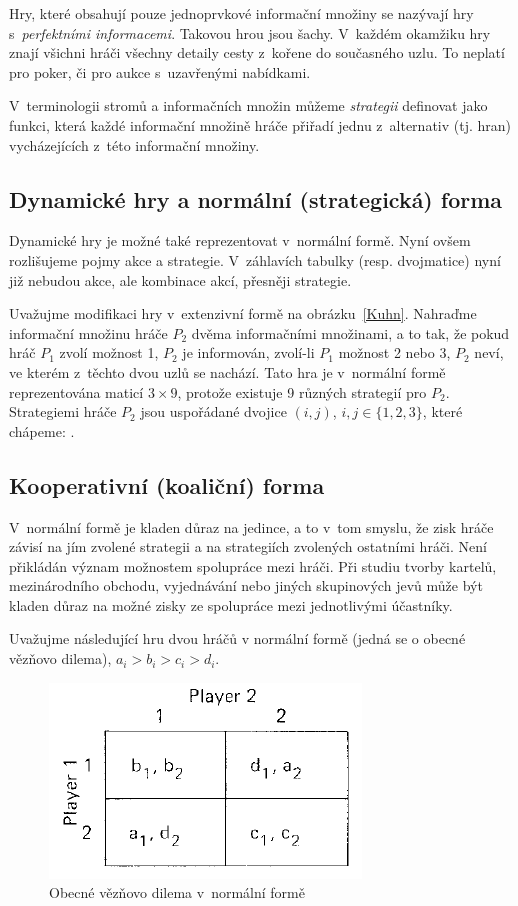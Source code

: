 \documentclass[12pt,a5paper]{article}
\begin{document}
Hry, které obsahují pouze jednoprvkové informační množiny se nazývají hry s~\emph{perfektními informacemi}. Takovou hrou jsou šachy. V~každém okamžiku hry znají všichni hráči všechny detaily cesty z~kořene do současného uzlu. To neplatí pro poker, či pro aukce s~uzavřenými nabídkami.

V~terminologii stromů a informačních množin můžeme \emph{strategii} definovat jako funkci, která každé informační množině hráče přiřadí jednu z~alternativ (tj. hran) vycházejících z~této informační množiny. 

\subsection{Dynamické hry a normální (strategická) forma}
Dynamické hry je možné také reprezentovat v~normální formě. Nyní ovšem rozlišujeme pojmy akce a strategie. V~záhlavích tabulky (resp. dvojmatice) nyní již nebudou akce, ale kombinace akcí, přesněji strategie.

Uvažujme modifikaci hry v~extenzivní formě na obrázku~\ref{Kuhn}. Nahraďme informační množinu hráče $P_2$ dvěma informačními množinami, a to tak, že pokud hráč $P_1$ zvolí možnost 1, $P_2$ je informován, zvolí-li $P_1$ možnost 2 nebo 3, $P_2$ neví, ve kterém z~těchto dvou uzlů se nachází. Tato hra je v~normální formě reprezentována maticí $3 \times 9$, protože existuje 9 různých strategií pro $P_2$. Strategiemi hráče $P_2$ jsou uspořádané dvojice $(i,j)$, $i,j \in \{1,2,3\}$, které chápeme: . 

\subsection{Kooperativní (koaliční) forma}
V~normální formě je kladen důraz na jedince, a to v~tom smyslu, že zisk hráče závisí na jím zvolené strategii a na strategiích zvolených ostatními hráči. Není přikládán význam možnostem spolupráce mezi hráči. Při studiu tvorby kartelů, mezinárodního obchodu, vyjednávání nebo jiných skupinových jevů může být kladen důraz na možné zisky ze spolupráce mezi jednotlivými účastníky. 

Uvažujme následující hru dvou hráčů v normální formě (jedná se o obecné vězňovo dilema), $a_i > b_i > c_i > d_i$.

\begin{figure}[htb]
\centering
\includegraphics[scale=0.35]{1_4.png}
\caption{ Obecné vězňovo dilema v~normální formě \label{prisoner}}
\end{figure}
\end{document}
